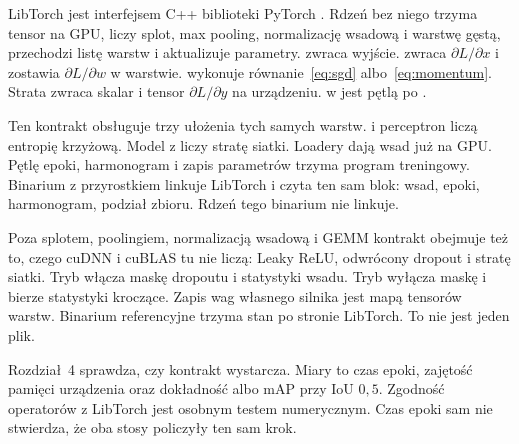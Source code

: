 LibTorch jest interfejsem C++ biblioteki PyTorch \cite{paszke2019pytorch}. Rdzeń  bez niego trzyma tensor na GPU, liczy splot, max pooling, normalizację wsadową i warstwę gęstą, przechodzi listę warstw i aktualizuje parametry.  zwraca wyjście.  zwraca \(\partial L / \partial x\) i zostawia \(\partial L / \partial w\) w warstwie.  wykonuje równanie~\eqref{eq:sgd} albo~\eqref{eq:momentum}. Strata zwraca skalar i tensor \(\partial L / \partial \hat{y}\) na urządzeniu.  w  jest pętlą po .

Ten kontrakt obsługuje trzy ułożenia tych samych warstw.  i perceptron liczą entropię krzyżową. Model z  liczy stratę siatki. Loadery dają wsad już na GPU. Pętlę epoki, harmonogram i zapis parametrów trzyma program treningowy. Binarium z przyrostkiem  linkuje LibTorch i czyta ten sam blok: wsad, epoki, harmonogram, podział zbioru. Rdzeń tego binarium nie linkuje.

Poza splotem, poolingiem, normalizacją wsadową i GEMM kontrakt obejmuje też to, czego cuDNN i cuBLAS tu nie liczą: Leaky ReLU, odwrócony dropout i stratę siatki. Tryb  włącza maskę dropoutu i statystyki wsadu. Tryb  wyłącza maskę i bierze statystyki kroczące. Zapis wag własnego silnika jest mapą tensorów warstw. Binarium referencyjne trzyma stan po stronie LibTorch. To nie jest jeden plik.

Rozdział~4 sprawdza, czy kontrakt wystarcza. Miary to czas epoki, zajętość pamięci urządzenia oraz dokładność albo mAP przy IoU \(0{,}5\). Zgodność operatorów z LibTorch jest osobnym testem numerycznym. Czas epoki sam nie stwierdza, że oba stosy policzyły ten sam krok.
